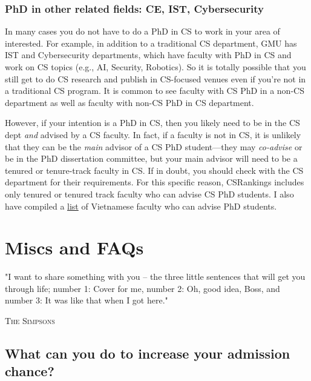 \documentclass[11pt]{article}
\begin{document}
\subsubsection{PhD in other related fields: CE, IST, Cybersecurity}

In many cases you do not have to do a PhD in CS to work in your area of interested. For example, in addition to a traditional CS department, GMU has IST and Cybersecurity departments, which have faculty  with PhD in CS and work on CS topics (e.g., AI, Security, Robotics).  So it is totally possible that you still get to do CS research and publish in CS-focused venues even if you're not in a traditional CS program.  It is  common to see faculty with CS PhD in a non-CS department as well as faculty with non-CS PhD in CS department.  

However, if your intention is a PhD in CS, then you likely need to be in the CS dept \emph{and} advised by a CS faculty. In fact, if a faculty is not in CS, it is unlikely that they can be the \emph{main} advisor of a CS PhD student---they may \emph{co-advise} or be in the PhD dissertation committee, but your main advisor will need to be a tenured or tenure-track faculty in CS. If in doubt, you should check with the CS department for their requirements.  For this specific reason,  CSRankings includes only tenured or tenured track faculty who can advise CS PhD students. I also have compiled a \href{https://github.com/dynaroars/dynaroars.github.io/wiki/Viet-CS-Profs-US}{list} of Vietnamese faculty who can advise PhD students. 


\section{Miscs and FAQs}
\epigraph{"I want to share something with you – the three little sentences that will get you through life; number 1: Cover for me, number 2: Oh, good idea, Boss, and number 3: It was like that when I got here."}{\textsc{The Simpsons}}

\subsection{What can you do to increase your admission chance?}\label{sec:improve-your-chance}
\end{document}
